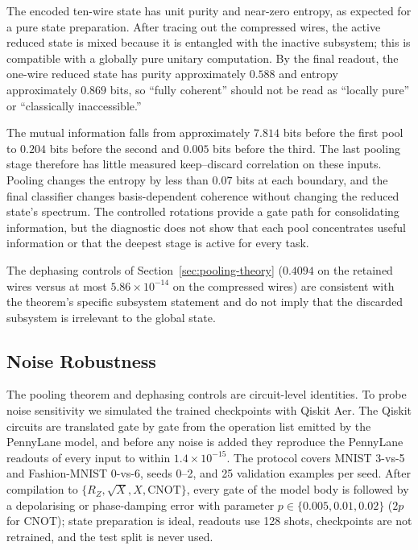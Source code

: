 \documentclass[conference]{IEEEtran}
\begin{document}
The encoded ten-wire state has unit purity and near-zero entropy, as expected
for a pure state preparation. After tracing out the compressed wires, the
active reduced state is mixed because it is entangled with the inactive
subsystem; this is compatible with a globally pure unitary computation. By the
final readout, the one-wire reduced state has purity approximately $0.588$ and
entropy approximately $0.869$ bits, so ``fully coherent'' should not be read as
``locally pure'' or ``classically inaccessible.''

The mutual information falls from approximately $7.814$ bits before the first
pool to $0.204$ bits before the second and $0.005$ bits before the third. The
last pooling stage therefore has little measured keep--discard correlation on
these inputs. Pooling changes the entropy by less than $0.07$ bits at
each boundary, and the final classifier changes basis-dependent coherence
without changing the reduced state's spectrum. The controlled rotations provide a gate path for consolidating information, but the diagnostic does not show that each
pool concentrates useful information or that the deepest stage is active for
every task.

The dephasing controls of Section~\ref{sec:pooling-theory} ($0.4094$ on the
retained wires versus at most $5.86\times10^{-14}$ on the compressed wires)
are consistent with the theorem's specific subsystem statement and do not
imply that the discarded subsystem is irrelevant to the global state.

\subsection{Noise Robustness}
\label{sec:noise}
The pooling theorem and dephasing controls are circuit-level identities. To probe noise sensitivity we simulated the trained checkpoints with Qiskit Aer. The Qiskit circuits are translated gate by gate from the operation list emitted by the PennyLane model, and before any noise is added they reproduce the PennyLane readouts of every input to within $1.4\times10^{-15}$. The protocol covers MNIST 3-vs-5 and Fashion-MNIST 0-vs-6, seeds 0--2, and 25 validation examples per seed. After compilation to $\{R_Z,\sqrt{X},X,\mathrm{CNOT}\}$, every gate of the model body is followed by a depolarising or phase-damping error with parameter $p\in\{0.005,0.01,0.02\}$ ($2p$ for CNOT); state preparation is ideal, readouts use 128 shots, checkpoints are not retrained, and the test split is never used.
\end{document}
